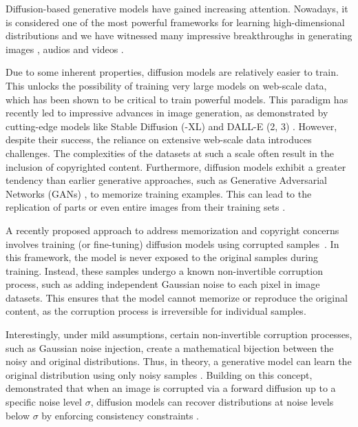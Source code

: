 Diffusion-based generative models \citep{DicksteinWMG2015,HoJA2020, SongME2021, SongDCKKEP2021, SongDCS2023} have gained increasing attention. Nowadays, it is considered one of the most powerful frameworks for learning high-dimensional distributions and we have witnessed many impressive breakthroughs  \citep{CroitoruHIS2023} in generating images \citep{HoJA2020, SongME2021, SongDCKKEP2021, RombachBLEO2022, SongDCS2023}, audios \citep{kong2021diffwave, YangYWWWZY2023} and videos \citep{HoSGCNF2022}. 

Due to some inherent properties, diffusion models are relatively easier to train. This unlocks the possibility of training very large models on web-scale data, which has been shown to be critical to train powerful models. This paradigm has recently led to impressive advances in image generation, as demonstrated by cutting-edge models like Stable Diffusion (-XL) \citep{RombachBLEO2022, PodellELBDMPR2023} and DALL-E (2, 3) \citep{BGJBWLOZLG2023}. However, despite their success, the reliance on extensive web-scale data introduces challenges. The complexities of the datasets at such a scale often result in the inclusion of copyrighted content. Furthermore, diffusion models exhibit a greater tendency than earlier generative approaches, such as Generative Adversarial Networks (GANs) \citep{GoodfellowPMXWOCB2014, GoodfellowPMXWOCB2020}, to memorize training examples. This can lead to the replication of parts or even entire images from their training sets \citep{CarliniHNJSTBIDW2023, SomepalliSGGG2023}.

A recently proposed approach to address memorization and copyright concerns involves training (or fine-tuning) diffusion models using corrupted samples~\cite{DarasSDGDK2023, SomepalliSGGG2023, DarasA2023, DarasDD2024}. In this framework, the model is never exposed to the original samples during training. Instead, these samples undergo a known non-invertible corruption process, such as adding independent Gaussian noise to each pixel in image datasets. This ensures that the model cannot memorize or reproduce the original content, as the corruption process is irreversible for individual samples. 
 
Interestingly, under mild assumptions, certain non-invertible corruption processes, such as Gaussian noise injection, create a mathematical bijection between the noisy and original distributions. Thus, in theory, a generative model can learn the original distribution using only noisy samples \citep{BoraPD2018}. Building on this concept, 
\citet{DarasDD2024} demonstrated that when an image is corrupted via a forward diffusion up to a specific noise level $\sigma$, diffusion models can recover distributions at noise levels below $\sigma$ by enforcing consistency constraints \citep{DarasDDD2023}.

